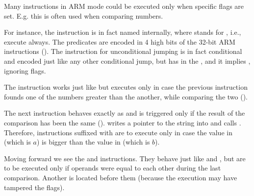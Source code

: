 \label{subsec:jcc_ARM}

\mysubparagraph{\OptimizingKeilVI (\ARMMode)}




Many instructions in ARM mode could be executed only when specific flags are set.
E.g. this is often used when comparing numbers.


For instance, the \ADD instruction is in fact named  internally, where  stands for
, i.e., execute always.
The predicates are encoded in 4 high bits of the 32-bit ARM instructions ().
The  instruction for unconditional jumping is in fact conditional and encoded just like any other
conditional jump, but has  in the , and it implies , 
ignoring flags.


The  instruction works just like  but executes only in case the previous \CMP
instruction founds one of the numbers greater than the another, while comparing the two ().


The next  instruction behaves exactly as  
and is triggered only if the result of the comparison has been the same (). 
 writes a pointer to the string  into  and  calls \printf.
Therefore, instructions suffixed with  are to execute only in case the value in  (which is $a$) is bigger than the value in  (which is $b$).


Moving forward we see the  and  instructions.
They behave just like  and , but are to be executed only if operands were equal to each
other during the last comparison.
Another \CMP is located before them (because the \printf execution may have tampered the flags).

